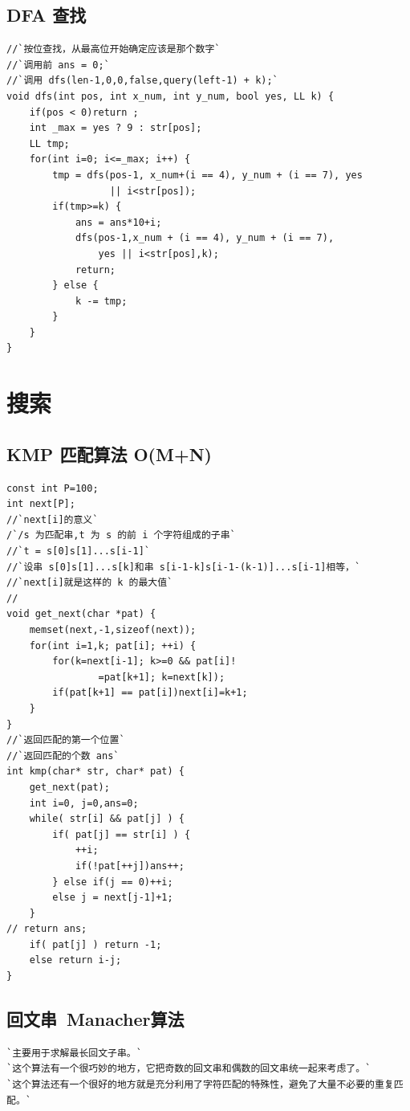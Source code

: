 \documentclass[a4paper]{article}
\begin{document}
\begin{CJK*}{UTF8}{gbsn}
\begin{multicols}{3}
\begin{flushleft}
\subsection{DFA 查找}
\begin{lstlisting}
//`按位查找，从最高位开始确定应该是那个数字`
//`调用前 ans = 0;`
//`调用 dfs(len-1,0,0,false,query(left-1) + k);`
void dfs(int pos, int x_num, int y_num, bool yes, LL k) {
    if(pos < 0)return ;
    int _max = yes ? 9 : str[pos];
    LL tmp;
    for(int i=0; i<=_max; i++) {
        tmp = dfs(pos-1, x_num+(i == 4), y_num + (i == 7), yes
                  || i<str[pos]);
        if(tmp>=k) {
            ans = ans*10+i;
            dfs(pos-1,x_num + (i == 4), y_num + (i == 7),
                yes || i<str[pos],k);
            return;
        } else {
            k -= tmp;
        }
    }
}
\end{lstlisting}

\section{搜索}

\subsection{KMP 匹配算法 O(M+N)}
\begin{lstlisting}
const int P=100;
int next[P];
//`next[i]的意义`
/`/s 为匹配串,t 为 s 的前 i 个字符组成的子串`
//`t = s[0]s[1]...s[i-1]`
//`设串 s[0]s[1]...s[k]和串 s[i-1-k]s[i-1-(k-1)]...s[i-1]相等，`
//`next[i]就是这样的 k 的最大值`
//
void get_next(char *pat) {
    memset(next,-1,sizeof(next));
    for(int i=1,k; pat[i]; ++i) {
        for(k=next[i-1]; k>=0 && pat[i]!
                =pat[k+1]; k=next[k]);
        if(pat[k+1] == pat[i])next[i]=k+1;
    }
}
//`返回匹配的第一个位置`
//`返回匹配的个数 ans`
int kmp(char* str, char* pat) {
    get_next(pat);
    int i=0, j=0,ans=0;
    while( str[i] && pat[j] ) {
        if( pat[j] == str[i] ) {
            ++i;
            if(!pat[++j])ans++;
        } else if(j == 0)++i;
        else j = next[j-1]+1;
    }
// return ans;
    if( pat[j] ) return -1;
    else return i-j;
}
\end{lstlisting}



\subsection{回文串~Manacher算法}
\begin{lstlisting}
`主要用于求解最长回文子串。`
`这个算法有一个很巧妙的地方，它把奇数的回文串和偶数的回文串统一起来考虑了。`
`这个算法还有一个很好的地方就是充分利用了字符匹配的特殊性，避免了大量不必要的重复匹配。`


\end{lstlisting}
\end{flushleft}
\end{multicols}
\end{CJK*}
\end{document}
